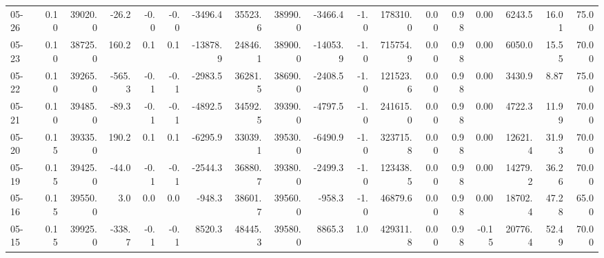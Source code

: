 \begin{threeparttable}
{\begin{tabular}{lrrrrrrrrrrrrrrrrr}
  05-26 &     0.10 & 39020.0 &             -26.2 &              -0.0 &               -0.0 &            -3496.4 & 35523.6 & 38990.0 &    -3466.4 &                     -1.0 &            178310.0 &       0.00 &      0.98 &           0.00 &           6243.5 &           16.01 &                  75.00 \\
  05-23 &     0.10 & 38725.0 &             160.2 &               0.1 &                0.1 &           -13878.9 & 24846.1 & 38900.0 &   -14053.9 &                     -1.0 &            715754.9 &       0.00 &      0.98 &           0.00 &           6050.0 &           15.55 &                  70.00 \\
  05-22 &     0.10 & 39265.0 &            -565.3 &              -0.1 &               -0.1 &            -2983.5 & 36281.5 & 38690.0 &    -2408.5 &                     -1.0 &            121523.6 &       0.00 &      0.98 &           0.00 &           3430.9 &            8.87 &                  75.00 \\
  05-21 &     0.10 & 39485.0 &             -89.3 &              -0.1 &               -0.1 &            -4892.5 & 34592.5 & 39390.0 &    -4797.5 &                     -1.0 &            241615.0 &       0.00 &      0.98 &           0.00 &           4722.3 &           11.99 &                  70.00 \\
  05-20 &     0.15 & 39335.0 &             190.2 &               0.1 &                0.1 &            -6295.9 & 33039.1 & 39530.0 &    -6490.9 &                     -1.0 &            323715.8 &       0.00 &      0.98 &           0.00 &          12621.4 &           31.93 &                  70.00 \\
  05-19 &     0.15 & 39425.0 &             -44.0 &              -0.1 &               -0.1 &            -2544.3 & 36880.7 & 39380.0 &    -2499.3 &                     -1.0 &            123438.5 &       0.00 &      0.98 &           0.00 &          14279.2 &           36.26 &                  70.00 \\
  05-16 &     0.15 & 39550.0 &               3.0 &               0.0 &                0.0 &             -948.3 & 38601.7 & 39560.0 &     -958.3 &                     -1.0 &             46879.6 &       0.00 &      0.98 &           0.00 &          18702.4 &           47.28 &                  65.00 \\
  05-15 &     0.15 & 39925.0 &            -338.7 &              -0.1 &               -0.1 &             8520.3 & 48445.3 & 39580.0 &     8865.3 &                      1.0 &            429311.8 &       0.00 &      0.98 &          -0.15 &          20776.4 &           52.49 &                  70.00 \\

\end{tabular}}
\end{threeparttable}
